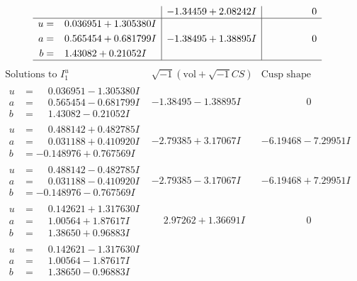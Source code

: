 \documentclass[1p]{elsarticle_modified}
\theoremstyle{definition}
\newcommand{\I}{\sqrt{-1}}
\begin{document}
$$\begin{array}{c|c|c}
 & -1.34459 + 2.08242 I & \phantom{-0.000000 } 0 \\ \hline\begin{aligned}
u &= \phantom{-}0.036951 + 1.305380 I \\
a &= \phantom{-}0.565454 + 0.681799 I \\
b &= \phantom{-}1.43082 + 0.21052 I\end{aligned}
 & -1.38495 + 1.38895 I & \phantom{-0.000000 } 0\\
 \hline 
 \end{array}$$\newpage$$\begin{array}{c|c|c}  
\text{Solutions to }I^u_{1}& \I (\text{vol} + \sqrt{-1}CS) & \text{Cusp shape}\\
 \hline 
\begin{aligned}
u &= \phantom{-}0.036951 - 1.305380 I \\
a &= \phantom{-}0.565454 - 0.681799 I \\
b &= \phantom{-}1.43082 - 0.21052 I\end{aligned}
 & -1.38495 - 1.38895 I & \phantom{-0.000000 } 0 \\ \hline\begin{aligned}
u &= \phantom{-}0.488142 + 0.482785 I \\
a &= \phantom{-}0.031188 + 0.410920 I \\
b &= -0.148976 + 0.767569 I\end{aligned}
 & -2.79385 + 3.17067 I & -6.19468 - 7.29951 I \\ \hline\begin{aligned}
u &= \phantom{-}0.488142 - 0.482785 I \\
a &= \phantom{-}0.031188 - 0.410920 I \\
b &= -0.148976 - 0.767569 I\end{aligned}
 & -2.79385 - 3.17067 I & -6.19468 + 7.29951 I \\ \hline\begin{aligned}
u &= \phantom{-}0.142621 + 1.317630 I \\
a &= \phantom{-}1.00564 + 1.87617 I \\
b &= \phantom{-}1.38650 + 0.96883 I\end{aligned}
 & \phantom{-}2.97262 + 1.36691 I & \phantom{-0.000000 } 0 \\ \hline\begin{aligned}
u &= \phantom{-}0.142621 - 1.317630 I \\
a &= \phantom{-}1.00564 - 1.87617 I \\
b &= \phantom{-}1.38650 - 0.96883 I\end{aligned}

\end{array}$$
\end{document}
